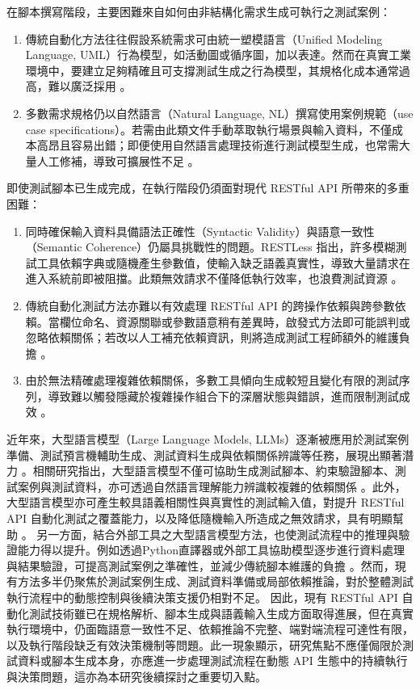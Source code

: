 \begin{ZhChapter}
\text 在腳本撰寫階段，主要困難來自如何由非結構化需求生成可執行之測試案例：
\begin{enumerate}
    \item 傳統自動化方法往往假設系統需求可由統一塑模語言（Unified Modeling Language, UML）行為模型，如活動圖或循序圖，加以表達。然而在真實工業環境中，要建立足夠精確且可支撐測試生成之行為模型，其規格化成本通常過高，難以廣泛採用 \parencite{Wang2020AutomaticGeneration}。
    \item 多數需求規格仍以自然語言（Natural Language, NL）撰寫使用案例規範（use case specifications）。若需由此類文件手動萃取執行場景與輸入資料，不僅成本高昂且容易出錯；即便使用自然語言處理技術進行測試模型生成，也常需大量人工修補，導致可擴展性不足 \parencite{Wang2020AutomaticGeneration}。
\end{enumerate}

\text 即使測試腳本已生成完成，在執行階段仍須面對現代 RESTful API 所帶來的多重困難：
\begin{enumerate}
    \item 同時確保輸入資料具備語法正確性（Syntactic Validity）與語意一致性（Semantic Coherence）仍屬具挑戰性的問題。RESTLess 指出，許多模糊測試工具依賴字典或隨機產生參數值，使輸入缺乏語義真實性，導致大量請求在進入系統前即被阻擋。此類無效請求不僅降低執行效率，也浪費測試資源 \parencite{Zheng2024RESTLess}。
    \item 傳統自動化測試方法亦難以有效處理 RESTful API 的跨操作依賴與跨參數依賴。當欄位命名、資源關聯或參數語意稍有差異時，啟發式方法即可能誤判或忽略依賴關係；若改以人工補充依賴資訊，則將造成測試工程師額外的維護負擔 \parencite{Nguyen2024KAT}。
    \item 由於無法精確處理複雜依賴關係，多數工具傾向生成較短且變化有限的測試序列，導致難以觸發隱藏於複雜操作組合下的深層狀態與錯誤，進而限制測試成效 \parencite{Zheng2024RESTLess, Meunier2022Black}。
\end{enumerate}

\text 近年來，大型語言模型（Large Language Models, LLMs）逐漸被應用於測試案例準備、測試預言機輔助生成、測試資料生成與依賴關係辨識等任務，展現出顯著潛力 \parencite{Wang2020AutomaticGeneration, Navarro2026Automatic}。相關研究指出，大型語言模型不僅可協助生成測試腳本、約束驗證腳本、測試案例與測試資料，亦可透過自然語言理解能力辨識較複雜的依賴關係 \parencite{Nguyen2024KAT}。此外，大型語言模型亦可產生較具語義相關性與真實性的測試輸入值，對提升 RESTful API 自動化測試之覆蓋能力，以及降低隨機輸入所造成之無效請求，具有明顯幫助 \parencite{Kim2025LlamaRestTest}。
\text 另一方面，結合外部工具之大型語言模型方法，也使測試流程中的推理與驗證能力得以提升。例如透過Python直譯器或外部工具協助模型逐步進行資料處理與結果驗證，可提高測試案例之準確性，並減少傳統腳本維護的負擔 \parencite{Wang2020AutomaticGeneration}。然而，現有方法多半仍聚焦於測試案例生成、測試資料準備或局部依賴推論，對於整體測試執行流程中的動態控制與後續決策支援仍相對不足。
\text 因此，現有 RESTful API 自動化測試技術雖已在規格解析、腳本生成與語義輸入生成方面取得進展，但在真實執行環境中，仍面臨語意一致性不足、依賴推論不完整、端對端流程可達性有限，以及執行階段缺乏有效決策機制等問題。此一現象顯示，研究焦點不應僅侷限於測試資料或腳本生成本身，亦應進一步處理測試流程在動態 API 生態中的持續執行與決策問題，這亦為本研究後續探討之重要切入點。


\end{ZhChapter}
